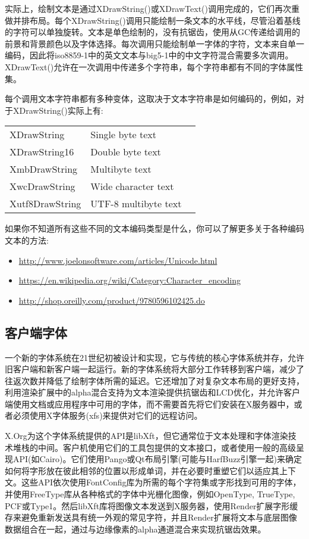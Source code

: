 实际上，绘制文本是通过XDrawString()或XDrawText()调用完成的，它们再次重做并排布局。每个XDrawString()调用只能绘制一条文本的水平线，尽管沿着基线的字符可以单独旋转。文本是单色绘制的，没有抗锯齿，使用从GC传递给调用的前景和背景颜色以及字体选择。每次调用只能绘制单一字体的字符，文本来自单一编码，因此将iso8859-1中的英文文本与big5-1中的中文字符混合需要多次调用。XDrawText()允许在一次调用中传递多个字符串，每个字符串都有不同的字体属性集。

每个调用文本字符串都有多种变体，这取决于文本字符串是如何编码的，例如，对于XDrawString()实际上有:

\begin{center}
	\begin{supertabular}{|l|l|l|}
		\hline
		XDrawString & Single byte text\\
		XDrawString16 & Double byte text\\
		XmbDrawString & Multibyte text\\
		XwcDrawString & Wide character text\\
		Xutf8DrawString & UTF-8 multibyte text\\
		\hline
	\end{supertabular}
\end{center}

如果你不知道所有这些不同的文本编码类型是什么，你可以了解更多关于各种编码文本的方法:

\begin{itemize}
	\item \url{http://www.joelonsoftware.com/articles/Unicode.html}
	\item \url{https://en.wikipedia.org/wiki/Category:Character_encoding}
	\item \url{http://shop.oreilly.com/product/9780596102425.do}
\end{itemize}

\subsection{客户端字体}

一个新的字体系统在21世纪初被设计和实现，它与传统的核心字体系统并存，允许旧客户端和新客户端一起运行。新的字体系统将大部分工作转移到客户端，减少了往返次数并降低了绘制字体所需的延迟。它还增加了对复杂文本布局的更好支持，利用渲染扩展中的alpha混合支持为文本渲染提供抗锯齿和LCD优化，并允许客户端使用文档或应用程序中可用的字体，而不需要首先将它们安装在X服务器中，或者必须使用X字体服务(xfs)来提供对它们的远程访问。

X.Org为这个字体系统提供的API是libXft，但它通常位于文本处理和字体渲染技术堆栈的中间。客户机使用它们的工具包提供的文本接口，或者使用一般的高级呈现API(如Cairo)。它们使用Pango或Qt布局引擎(可能与HarfBuzz引擎一起)来确定如何将字形放在彼此相邻的位置以形成单词，并在必要时重塑它们以适应其上下文。这些API依次使用FontConfig库为所需的每个字符集或字形找到可用的字体，并使用FreeType库从各种格式的字体中光栅化图像，例如OpenType, TrueType, PCF或Type1。然后libXft库将图像文本发送到X服务器，使用Render扩展字形缓存来避免重新发送具有统一外观的常见字符，并且Render扩展将文本与底层图像数据组合在一起，通过与边缘像素的alpha通道混合来实现抗锯齿效果。

